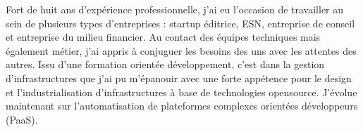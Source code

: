 

\begin{cvparagraph}

Fort de huit ans d’expérience professionnelle, j'ai eu l’occasion de travailler au sein de plusieurs types d’entreprises : startup éditrice, ESN, entreprise de conseil et entreprise du milieu financier. Au contact des équipes techniques mais également métier, j'ai appris à conjuguer les besoins des uns avec les attentes des autres.
Issu d'une formation orientée développement, c'est dans la gestion d'infrastructures que j'ai pu m'épanouir avec une forte appétence pour le design et l'industrialisation d'infrastructures à base de technologies opensource.
J'évolue maintenant sur l'automatisation de plateformes complexes orientées développeurs (PaaS).
\end{cvparagraph}
